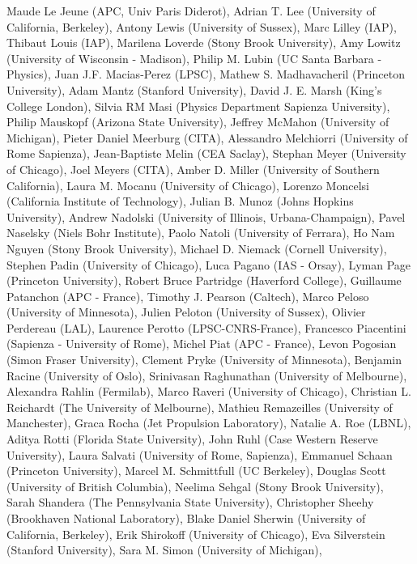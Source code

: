 Maude Le Jeune (APC, Univ Paris Diderot),
Adrian T. Lee (University of California, Berkeley),
Antony Lewis (University of Sussex),
Marc Lilley (IAP),
Thibaut Louis (IAP),
Marilena Loverde (Stony Brook University),
Amy Lowitz (University of Wisconsin - Madison),
Philip M. Lubin (UC Santa Barbara - Physics),
Juan J.F. Macias-Perez (LPSC),
Mathew S. Madhavacheril (Princeton University),
Adam Mantz (Stanford University),
David J. E. Marsh (King's College London),
Silvia RM Masi (Physics Department Sapienza University),
Philip Mauskopf (Arizona State University),
Jeffrey McMahon (University of Michigan),
Pieter Daniel Meerburg (CITA),
Alessandro Melchiorri (University of Rome Sapienza),
Jean-Baptiste Melin (CEA Saclay),
Stephan Meyer (University of Chicago),
Joel Meyers (CITA),
Amber D. Miller (University of Southern California),
Laura M. Mocanu (University of Chicago),
Lorenzo Moncelsi (California Institute of Technology),
Julian B. Munoz (Johns Hopkins University),
Andrew Nadolski (University of Illinois, Urbana-Champaign),
Pavel Naselsky (Niels Bohr Institute),
Paolo Natoli (University of Ferrara),
Ho Nam Nguyen (Stony Brook University),
Michael D. Niemack (Cornell University),
Stephen Padin (University of Chicago),
Luca Pagano (IAS - Orsay),
Lyman Page (Princeton University),
Robert Bruce Partridge (Haverford College),
Guillaume Patanchon (APC - France),
Timothy J. Pearson (Caltech),
Marco Peloso (University of Minnesota),
Julien Peloton (University of Sussex),
Olivier Perdereau (LAL),
Laurence Perotto (LPSC-CNRS-France),
Francesco Piacentini (Sapienza - University of Rome),
Michel Piat (APC - France),
Levon Pogosian (Simon Fraser University),
Clement Pryke (University of Minnesota),
Benjamin Racine (University of Oslo),
Srinivasan Raghunathan (University of Melbourne),
Alexandra Rahlin (Fermilab),
Marco Raveri (University of Chicago),
Christian L. Reichardt (The University of Melbourne),
Mathieu Remazeilles (University of Manchester),
Graca Rocha (Jet Propulsion Laboratory),
Natalie A. Roe (LBNL),
Aditya Rotti (Florida State University),
John Ruhl (Case Western Reserve University),
Laura Salvati (University of Rome, Sapienza),
Emmanuel Schaan (Princeton University),
Marcel M. Schmittfull (UC Berkeley),
Douglas Scott (University of British Columbia),
Neelima Sehgal (Stony Brook University),
Sarah Shandera (The Pennsylvania State University),
Christopher Sheehy (Brookhaven National Laboratory),
Blake Daniel Sherwin (University of California, Berkeley),
Erik Shirokoff (University of Chicago),
Eva Silverstein (Stanford University),
Sara M. Simon (University of Michigan),
